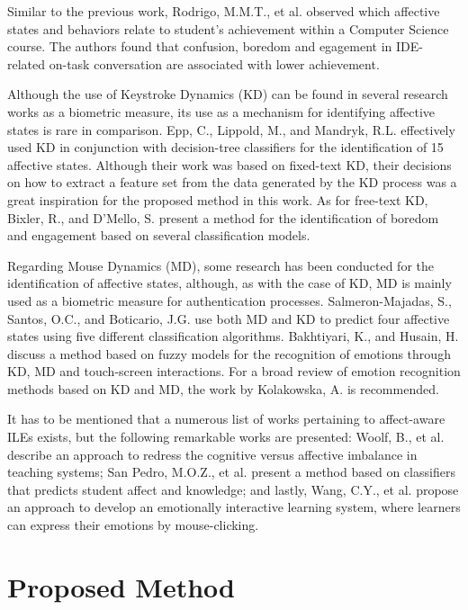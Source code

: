\documentclass[runningheads,a4paper]{llncs}
\begin{document}
Similar to the previous work, Rodrigo, M.M.T., et al. \cite{emotions-novices-programming2} observed which affective states and behaviors relate to student's achievement within a Computer Science course. The authors found that confusion, boredom and egagement in IDE-related on-task conversation are associated with lower achievement.

Although the use of Keystroke Dynamics (KD) can be found in several research works as a biometric measure, its use as a mechanism for identifying affective states is rare in comparison. Epp, C., Lippold, M., and Mandryk, R.L. \cite{keystroke-dynamics1} effectively used KD in conjunction with decision-tree classifiers for the identification of 15 affective states. Although their work was based on fixed-text KD, their decisions on how to extract a feature set from the data generated by the KD process was a great inspiration for the proposed method in this work. As for free-text KD, Bixler, R., and D'Mello, S. \cite{keystroke-dynamics2} present a method for the identification of boredom and engagement based on several classification models.

Regarding Mouse Dynamics (MD), some research has been conducted for the identification of affective states, although, as with the case of KD, MD is mainly used as a biometric measure for authentication processes. Salmeron-Majadas, S., Santos, O.C., and Boticario, J.G. \cite{mouse-dynamics1} use both MD and KD to predict four affective states using five different classification algorithms. Bakhtiyari, K., and Husain, H. \cite{mouse-dynamics2} discuss a method based on fuzzy models for the recognition of emotions through KD, MD and touch-screen interactions. For a broad review of emotion recognition methods based on KD and MD, the work by Kolakowska, A. \cite{keystroke-mouse-review} is recommended.

It has to be mentioned that a numerous list of works pertaining to affect-aware ILEs exists, but the following remarkable works are presented: Woolf, B., et al. \cite{affect-aware-general1} describe an approach to redress the cognitive versus affective imbalance in teaching systems; San Pedro, M.O.Z., et al. \cite{affect-aware-general2} present a method based on classifiers that predicts student affect and knowledge; and lastly, Wang, C.Y., et al. \cite{affect-aware-general3} propose an approach to develop an emotionally interactive learning system, where learners can express their emotions by mouse-clicking.

\section{Proposed Method}
\label{proposed-method}
\end{document}
